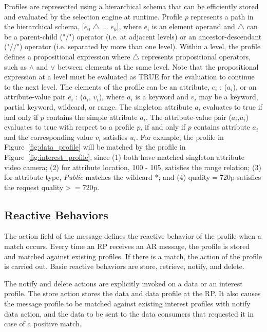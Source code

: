 Profiles are represented using a hierarchical schema that can be efficiently stored and evaluated by the selection engine at runtime. Profile $p$ represents a path in the hierarchical schema, [$e_0$ $\bigtriangleup$ ... $e_k$], where $e_i$ is an element operand and $\bigtriangleup$ can be a parent-child ("/") operator (i.e. at adjacent levels) or an ancestor-descendant ("//") operator (i.e. separated by more than one level). Within a level, the profile defines a propositional expression where $\bigtriangleup$ represents propositional operators, such as $\wedge$ and $\vee$ between elements at the same level. Note that the propositional expression at a level must be evaluated as TRUE for the evaluation to continue to the next level. The elements of the profile can be an attribute, $e_i$ : ($a_i$), or an attribute-value pair $e_i$ : ($a_i$, $v_i$), where $a_i$ is a keyword and $v_i$ may be a keyword, partial keyword, wildcard, or range. The singleton attribute $a_i$ evaluates to true if and only if $p$ contains the simple attribute $a_i$. The attribute-value pair ($a_i$,$u_i$) evaluates to true with respect to a profile $p$, if and only if $p$ contains attribute $a_i$ and the corresponding value $v_i$ satisfies $u_i$. For example, the profile in Figure~\ref{fig:data_profile} will be matched by the profile in Figure~\ref{fig:interest_profile}, since (1) both have matched singleton attribute video camera; (2) for attribute location, 100 - 105, satisfies the range relation; (3) for attribute type, {\it Public} matches the wildcard *; and (4) quality$=$720p satisfies the request quality$>=$720p. 

\subsection{Reactive Behaviors} 
The action field of the message defines the reactive behavior of the profile when a match occurs. Every time an RP receives an AR message, the profile is stored and matched against existing profiles. If there is a match, the action of the profile is carried out. Basic reactive behaviors are store, retrieve, notify, and delete.

The notify and delete actions are explicitly invoked on a data or an interest profile. The store
action stores the data and data profile at the RP. It also causes the message profile to be matched
against existing interest profiles with notify data action, and the data to be sent to the data consumers
that requested it in case of a positive match.

